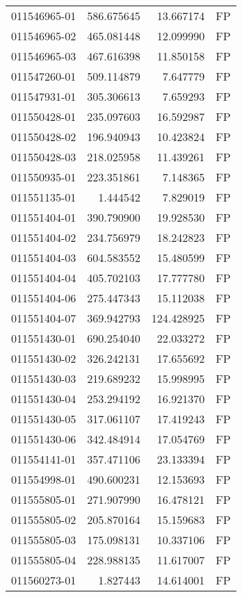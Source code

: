 \begin{tabular}{lrrl}
011546965-01 &  586.675645 &    13.667174 &   FP \\
011546965-02 &  465.081448 &    12.099990 &   FP \\
011546965-03 &  467.616398 &    11.850158 &   FP \\
011547260-01 &  509.114879 &     7.647779 &   FP \\
011547931-01 &  305.306613 &     7.659293 &   FP \\
011550428-01 &  235.097603 &    16.592987 &   FP \\
011550428-02 &  196.940943 &    10.423824 &   FP \\
011550428-03 &  218.025958 &    11.439261 &   FP \\
011550935-01 &  223.351861 &     7.148365 &   FP \\
011551135-01 &    1.444542 &     7.829019 &   FP \\
011551404-01 &  390.790900 &    19.928530 &   FP \\
011551404-02 &  234.756979 &    18.242823 &   FP \\
011551404-03 &  604.583552 &    15.480599 &   FP \\
011551404-04 &  405.702103 &    17.777780 &   FP \\
011551404-06 &  275.447343 &    15.112038 &   FP \\
011551404-07 &  369.942793 &   124.428925 &   FP \\
011551430-01 &  690.254040 &    22.033272 &   FP \\
011551430-02 &  326.242131 &    17.655692 &   FP \\
011551430-03 &  219.689232 &    15.998995 &   FP \\
011551430-04 &  253.294192 &    16.921370 &   FP \\
011551430-05 &  317.061107 &    17.419243 &   FP \\
011551430-06 &  342.484914 &    17.054769 &   FP \\
011554141-01 &  357.471106 &    23.133394 &   FP \\
011554998-01 &  490.600231 &    12.153693 &   FP \\
011555805-01 &  271.907990 &    16.478121 &   FP \\
011555805-02 &  205.870164 &    15.159683 &   FP \\
011555805-03 &  175.098131 &    10.337106 &   FP \\
011555805-04 &  228.988135 &    11.617007 &   FP \\
011560273-01 &    1.827443 &    14.614001 &   FP \\

\end{tabular}
